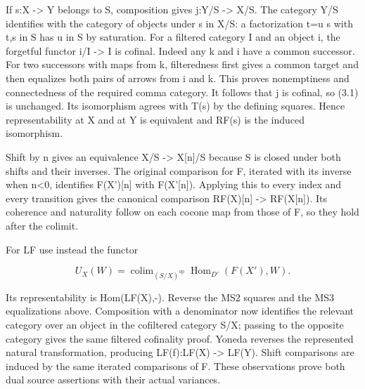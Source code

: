 \documentclass[11pt]{article}
\begin{document}
If s:\allowbreak{}X \allowbreak{}-> Y belongs to S,\allowbreak{} composition gives j:\allowbreak{}Y/\allowbreak{}S \allowbreak{}-> X/\allowbreak{}S. The category Y/\allowbreak{}S identifies with the category of objects under s in X/\allowbreak{}S:\allowbreak{} a factorization t\allowbreak{}=u s with t,\allowbreak{}s in S has u in S by saturation. For a filtered category I and an object i,\allowbreak{} the forgetful functor i/\allowbreak{}I \allowbreak{}-> I is cofinal. Indeed any k and i have a common successor. For two successors with maps from k,\allowbreak{} filteredness first gives a common target and then equalizes both pairs of arrows from i and k. This proves nonemptiness and connectedness of the required comma category. It follows that j is cofinal,\allowbreak{} so (3.1)\allowbreak{} is unchanged. Its isomorphism agrees with T(s)\allowbreak{} by the defining squares. Hence representability at X and at Y is equivalent and RF(s)\allowbreak{} is the induced isomorphism.

Shift by n gives an equivalence X/\allowbreak{}S \allowbreak{}-> X[n]\allowbreak{}/\allowbreak{}S because S is closed under both shifts and their inverses. The original comparison for F,\allowbreak{} iterated with its inverse when n<0,\allowbreak{} identifies F(X')\allowbreak{}[n]\allowbreak{} with F(X'[n]\allowbreak{})\allowbreak{}. Applying this to every index and every transition gives the canonical comparison RF(X)\allowbreak{}[n]\allowbreak{} \allowbreak{}-> RF(X[n]\allowbreak{})\allowbreak{}. Its coherence and naturality follow on each cocone map from those of F,\allowbreak{} so they hold after the colimit.

For LF use instead the functor

\[
 U_X(W)=\mathop{\operatorname{colim}}_{(S/X)^{\mathrm{op}}}
                         \operatorname{Hom}_{D'}(F(X'),W).
\]

Its representability is Hom(LF(X)\allowbreak{},\allowbreak{}-)\allowbreak{}. Reverse the MS2 squares and the MS3 equalizations above. Composition with a denominator now identifies the relevant category over an object in the cofiltered category S/\allowbreak{}X; passing to the opposite category gives the same filtered cofinality proof. Yoneda reverses the represented natural transformation,\allowbreak{} producing LF(f)\allowbreak{}:\allowbreak{}LF(X)\allowbreak{} \allowbreak{}-> LF(Y)\allowbreak{}. Shift comparisons are induced by the same iterated comparisons of F. These observations prove both dual source assertions with their actual variances.
\end{document}
